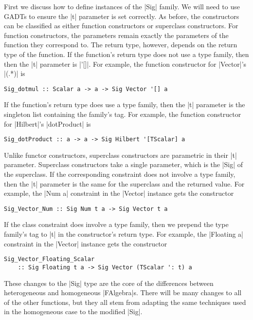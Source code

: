 \documentclass[preprint]{sigplanconf}
\theoremstyle{definition}
\begin{document}
First we discuss how to define instances of the |Sig| family.
We will need to use GADTs \cite{schrijvers2009complete} to ensure the |t| parameter is set correctly.
As before, the constructors can be classified as either function constructors or superclass constructors.
For function constructors, the parameters remain exactly the parameters of the function they correspond to.
The return type, however, depends on the return type of the function.
If the function's return type does not use a type family, then then the |t| parameter is |'[]|.
For example, the function constructor for |Vector|'s |(.*)| is
\begin{lstlisting}
Sig_dotmul :: Scalar a -> a -> Sig Vector '[] a
\end{lstlisting}
If the function's return type does use a type family, then the |t| parameter is the singleton list containing the family's tag.
For example, the function constructor for |Hilbert|'s |dotProduct| is
\begin{lstlisting}
Sig_dotProduct :: a -> a -> Sig Hilbert '[TScalar] a
\end{lstlisting}
Unlike functor constructors, superclass constructors are parametric in their |t| parameter.
Superclass constructors take a single parameter,
which is the |Sig| of the superclass.
If the corresponding constraint does not involve a type family,
then the |t| parameter is the same for the superclass and the returned value.
For example, the |Num a| constraint in the |Vector| instance gets the constructor
\begin{lstlisting}
Sig_Vector_Num :: Sig Num t a -> Sig Vector t a
\end{lstlisting}
If the class constraint does involve a type family,
then we prepend the type family's tag to |t| in the constructor's return type.
For example, the |Floating a| constraint in the |Vector| instance gets the constructor
\begin{lstlisting}
Sig_Vector_Floating_Scalar
    :: Sig Floating t a -> Sig Vector (TScalar ': t) a
\end{lstlisting}
These changes to the |Sig| type are the core of the differences between heterogeneous and homogeneous |FAlgebra|s.
There will be many changes to all of the other functions,
but they all stem from adapting the same techniques used in the homogeneous case to the modified |Sig|.
\end{document}
